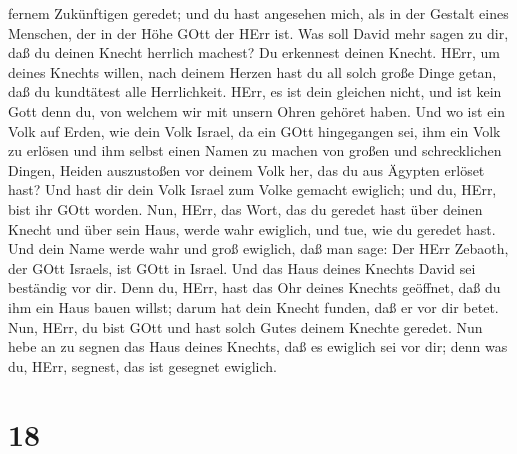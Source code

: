 fernem Zukünftigen geredet; und du hast angesehen mich, als in der
Gestalt eines Menschen, der in der Höhe GOtt der HErr ist. 
Was soll David mehr sagen zu dir, daß du deinen Knecht herrlich machest?
Du erkennest deinen Knecht.  HErr, um deines Knechts
willen, nach deinem Herzen hast du all solch große Dinge getan, daß du
kundtätest alle Herrlichkeit.  HErr, es ist dein gleichen
nicht, und ist kein Gott denn du, von welchem wir mit unsern Ohren
gehöret haben.  Und wo ist ein Volk auf Erden, wie dein
Volk Israel, da ein GOtt hingegangen sei, ihm ein Volk zu erlösen und
ihm selbst einen Namen zu machen von großen und schrecklichen Dingen,
Heiden auszustoßen vor deinem Volk her, das du aus Ägypten erlöset hast?
 Und hast dir dein Volk Israel zum Volke gemacht ewiglich;
und du, HErr, bist ihr GOtt worden.  Nun, HErr, das Wort,
das du geredet hast über deinen Knecht und über sein Haus, werde wahr
ewiglich, und tue, wie du geredet hast.  Und dein Name
werde wahr und groß ewiglich, daß man sage: Der HErr Zebaoth, der GOtt
Israels, ist GOtt in Israel. Und das Haus deines Knechts David sei
beständig vor dir.  Denn du, HErr, hast das Ohr deines
Knechts geöffnet, daß du ihm ein Haus bauen willst; darum hat dein
Knecht funden, daß er vor dir betet.  Nun, HErr, du bist
GOtt und hast solch Gutes deinem Knechte geredet.  Nun hebe
an zu segnen das Haus deines Knechts, daß es ewiglich sei vor dir; denn
was du, HErr, segnest, das ist gesegnet ewiglich.

\hypertarget{section-17}{%
\section{18}\label{section-17}}

